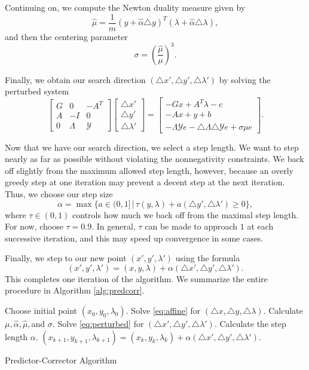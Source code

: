 Continuing on, we compute the Newton duality measure given by
\[
\hat{\mu} = \frac{1}{m}(y + \hat{\alpha}\triangle y)^T(\lambda + \hat{\alpha}\triangle \lambda),
\]
and then the centering parameter
\[
\sigma = \left(\frac{\hat{\mu}}{\mu}\right)^3.
\]

Finally, we obtain our search direction $(\triangle x', \triangle y', \triangle \lambda')$ by solving the perturbed
system
\begin{equation}
\begin{bmatrix}
G & 0 & -A^T\\
A & -I & 0\\
0 & \Lambda & \mathcal{Y}
\end{bmatrix}
\begin{bmatrix}
\triangle x'\\
\triangle y'\\
\triangle \lambda'
\end{bmatrix}
=
\begin{bmatrix}
-Gx + A^T\lambda - c\\
-Ax + y + b\\
-\Lambda\mathcal{Y}e - \triangle \Lambda\triangle\mathcal{Y}e + \sigma\mu e
\end{bmatrix}.
\label{eq:perturbed}
\end{equation}

Now that we have our search direction, we select a step length. We want to step nearly as far as possible
without violating the nonnegativity constraints. We back off slightly from the maximum allowed step length, however,
because an overly greedy step at one iteration may prevent a decent step at the next iteration. Thus,
we choose our step size
\[
\alpha = \max\{a \in (0,1] \, | \, \tau(y,\lambda) +a(\triangle y', \triangle \lambda') \geq 0\},
\]
where $\tau \in (0,1)$ controls how much we back off from the maximal step length. For now, choose $\tau = 0.9$.
In general, $\tau$ can be made to approach $1$ at each successive iteration, and this may speed up convergence in some cases.

Finally, we step to our new point $(x', y', \lambda')$ using the formula
\[
(x', y', \lambda') = (x, y, \lambda) + \alpha(\triangle x', \triangle y', \triangle \lambda').
\]
This completes one iteration of the algorithm.
We summarize the entire procedure in Algorithm \ref{alg:predcorr}.
\begin{algorithm}
\begin{algorithmic}[1]
    \State \textrm{Choose initial point } $(x_0, y_0, \lambda_0)$.
        \State \textrm{Solve \ref{eq:affine} for } $(\triangle x, \triangle y, \triangle \lambda)$.
        \State \textrm{Calculate } $\mu, \hat{\alpha}, \hat{\mu},$\textrm{and} $\sigma$.
        \State \textrm{Solve \ref{eq:perturbed} for } $(\triangle x', \triangle y',\triangle \lambda')$.
        \State \textrm{Calculate the step length } $\alpha$.
        \State $(x_{k+1}, y_{k+1}, \lambda_{k+1}) = (x_k, y_k, \lambda_k) + \alpha(\triangle x', \triangle y', \triangle \lambda').$
    \EndFor
\EndProcedure
\end{algorithmic}
\caption{Predictor-Corrector Algorithm}
\label{alg:predcorr}
\end{algorithm}

